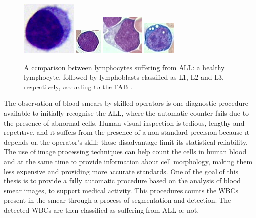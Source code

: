\documentclass[final,a4paper,12pt,english]{UnicaPhdThesis3}
\begin{document}
	\begin{figure}[!t]
		\centering
		\includegraphics[height=0.125\textheight]{images/crop-BlastNo}
		\includegraphics[height=0.125\textheight]{images/crop-BlastL1}
		\includegraphics[height=0.125\textheight]{images/crop-BlastL2}
		\includegraphics[height=0.125\textheight]{images/crop-BlastL3}
		\caption{\label{fig:ex2}A comparison between lymphocytes suffering from ALL: a healthy lymphocyte, followed by lymphoblasts classified as L1, L2 and L3, respectively, according to the FAB \cite{Bennett}.}
	\end{figure}
	
	The observation of blood smears by skilled operators is one diagnostic procedure available to initially recognise the ALL, where the automatic counter fails due to the presence of abnormal cells. Human visual inspection is tedious, lengthy and repetitive, and it suffers from the presence of a non-standard precision because it depends on the operator's skill; these disadvantage limit its statistical reliability. The use of image processing techniques can help count the cells in human blood and at the same time to provide information about cell morphology, making them less expensive and providing more accurate standards. One of the goal of this thesis is to provide a fully automatic procedure based on the analysis of blood smear images, to support medical activity. This procedures counts the WBCs present in the smear through a process of segmentation and detection. The detected WBCs are then classified as suffering from ALL or not. 
	
\end{document}
